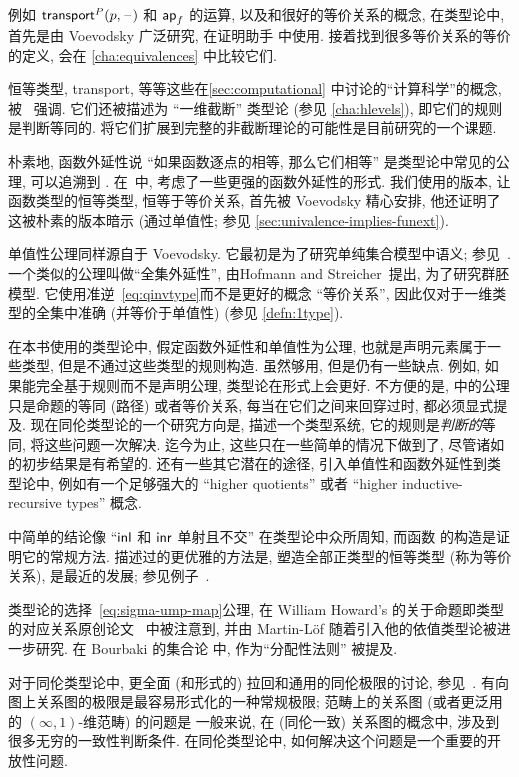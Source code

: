 %
例如 $\mathsf{transport}^{P}(p,\mathord{\hspace{1pt}\text{--}\hspace{1pt}})$ 和 $\mathsf{ap}_{f}$ 的运算, 以及和很好的等价关系的概念, 在类型论中, 首先是由 Voevodsky 广泛研究, 在证明助手 \Coq 中使用.
接着找到很多等价关系的等价的定义, 会在 \cref{cha:equivalences} 中比较它们.

恒等类型, transport, 等等这些在\cref{sec:computational} 中讨论的``计算科学''的概念, 被~\cite{lh:canonicity} 强调.
它们还被描述为 ``一维截断'' 类型论 (参见 \cref{cha:hlevels}), 即它们的规则是判断等同的.
将它们扩展到完整的非截断理论的可能性是目前研究的一个课题.

%
朴素地, 函数外延性说 ``如果函数逐点的相等, 那么它们相等'' 是类型论中常见的公理, 可以追溯到 \cite{PM2}.
在~\cite{garner:depprod}中, 考虑了一些更强的函数外延性的形式.
我们使用的版本, 让函数类型的恒等类型, 恒等于等价关系, 首先被 Voevodsky 精心安排, 他还证明了这被朴素的版本暗示 (通过单值性; 参见 \cref{sec:univalence-implies-funext}).

%
单值性公理同样源自于 Voevodsky.
它最初是为了研究单纯集合模型中语义; 参见~\cite{klv:ssetmodel}.
一个类似的公理叫做``全集外延性'', 由Hofmann and Streicher~\cite{hs:gpd-typethy}提出, 为了研究群胚模型.
它使用准逆~\eqref{eq:qinvtype}而不是更好的概念 ``等价关系'', 因此仅对于一维类型的全集中准确 (并等价于单值性) (参见 \cref{defn:1type}).

在本书使用的类型论中, 假定函数外延性和单值性为公理, 也就是声明元素属于一些类型, 但是不通过这些类型的规则构造.
虽然够用, 但是仍有一些缺点.
例如, 如果能完全基于规则而不是声明公理, 类型论在形式上会更好.
不方便的是,  中的公理只是命题的等同 (路径) 或者等价关系, 每当在它们之间来回穿过时, 都必须显式提及.
现在同伦类型论的一个研究方向是, 描述一个类型系统, 它的规则是\emph{判断的}等同, 将这些问题一次解决.
迄今为止, 这些只在一些简单的情况下做到了, 尽管诸如~\cite{lh:canonicity} 的初步结果是有希望的.
还有一些其它潜在的途径, 引入单值性和函数外延性到类型论中, 例如有一个足够强大的 ``higher quotients'' 或者 ``higher inductive-recursive types'' 概念.

 中简单的结论像 ``${\mathsf{inl}}$ 和 ${\mathsf{inr}}$ 单射且不交'' 在类型论中众所周知, 而函数 \encode 的构造是证明它的常规方法.
描述过的更优雅的方法是, 塑造全部正类型的恒等类型 (称为等价关系), 是最近的发展; 参见例子~\cite{ls:pi1s1}.

%
类型论的选择~\eqref{eq:sigma-ump-map}公理, 在 William Howard's 的关于命题即类型的对应关系原创论文~\cite{howard:pat} 中被注意到, 并由 Martin-L\"of 随着引入他的依值类型论被进一步研究.
在 Bourbaki 的集合论 \cite{Bourbaki} 中, 作为``分配性法则'' 被提及.%

对于同伦类型论中, 更全面 (和形式的) 拉回和通用的同伦极限的讨论, 参见~\cite{AKL13}.
有向图上关系图的极限是最容易形式化的一种常规极限; 范畴上的关系图 (或者更泛用的 $(\infty,1)$-维范畴) 的问题是
%
%
一般来说, 在 (同伦一致) 关系图的概念中, 涉及到很多无穷的一致性判断条件.
在同伦类型论中, 如何解决这个问题是一个重要的开放性问题.
